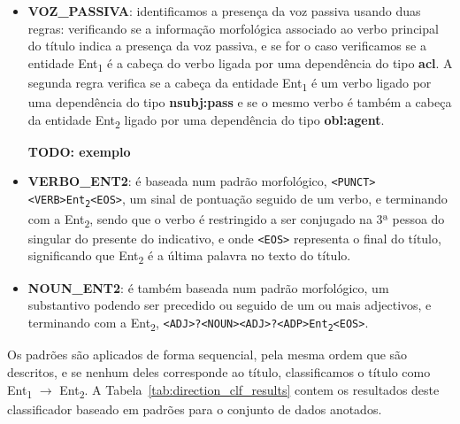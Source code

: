 \documentclass[a4paper, twocolumn, 11pt, twoside]{article}
\begin{document}
\begin{itemize}

\item \textbf{VOZ\_PASSIVA}: identificamos a presença da voz passiva usando duas regras: verificando se a informação morfológica associado ao verbo principal do título indica a presença da voz passiva, e se for o caso verificamos se a entidade Ent\textsubscript{1} é a cabeça do verbo ligada por uma dependência do tipo \textbf{acl}. A segunda regra verifica se a cabeça da entidade Ent\textsubscript{1} é um verbo ligado por uma dependência do tipo \textbf{nsubj:pass} e se o mesmo verbo é também a cabeça da entidade Ent\textsubscript{2} ligado por uma dependência do tipo \textbf{obl:agent}.

\textbf{TODO: exemplo}


\item \textbf{VERBO\_ENT2}: é baseada num padrão morfológico, \texttt{<PUNCT><VERB>Ent\textsubscript{2}<EOS>}, um sinal de pontuação seguido de um verbo, e terminando com a Ent\textsubscript{2}, sendo que o verbo é restringido a ser conjugado na 3ª pessoa do singular do presente do indicativo, e onde \texttt{<EOS>} representa o final do título, significando que Ent\textsubscript{2} é a última palavra no texto do título.

\item \textbf{NOUN\_ENT2}: é também baseada num padrão morfológico, um substantivo podendo ser precedido ou seguido de um ou mais adjectivos, e terminando com a Ent\textsubscript{2}, \texttt{<ADJ>?<NOUN><ADJ>?<ADP>Ent\textsubscript{2}<EOS>}.

\end{itemize}

Os padrões são aplicados de forma sequencial, pela mesma ordem que são descritos, e se nenhum deles corresponde ao título, classificamos o título como {Ent\textsubscript{1} $\rightarrow$ Ent\textsubscript{2}}. A Tabela~\ref{tab:direction_clf_results} contem os resultados deste classificador baseado em padrões para o conjunto de dados anotados.
\end{document}
